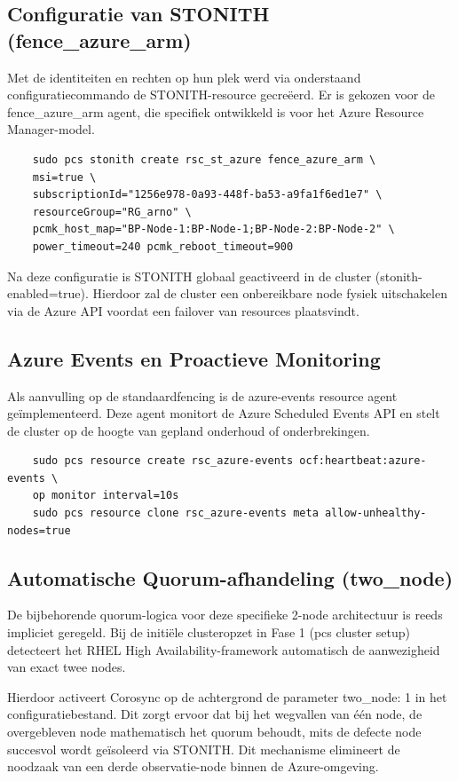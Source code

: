 \subsection{Configuratie van STONITH (fence\_azure\_arm)}
Met de identiteiten en rechten op hun plek werd via onderstaand configuratiecommando de STONITH-resource gecreëerd. Er is gekozen voor de fence\_azure\_arm agent, die specifiek ontwikkeld is voor het Azure Resource Manager-model.

\begin{verbatim}
    sudo pcs stonith create rsc_st_azure fence_azure_arm \
    msi=true \
    subscriptionId="1256e978-0a93-448f-ba53-a9fa1f6ed1e7" \
    resourceGroup="RG_arno" \
    pcmk_host_map="BP-Node-1:BP-Node-1;BP-Node-2:BP-Node-2" \
    power_timeout=240 pcmk_reboot_timeout=900
\end{verbatim}

Na deze configuratie is STONITH globaal geactiveerd in de cluster (stonith-enabled=true). Hierdoor zal de cluster een onbereikbare node fysiek uitschakelen via de Azure API voordat een failover van resources plaatsvindt.

\subsection{Azure Events en Proactieve Monitoring}
Als aanvulling op de standaardfencing is de azure-events resource agent geïmplementeerd. Deze agent monitort de Azure Scheduled Events API en stelt de cluster op de hoogte van gepland onderhoud of onderbrekingen.

\begin{verbatim}
    sudo pcs resource create rsc_azure-events ocf:heartbeat:azure-events \
    op monitor interval=10s
    sudo pcs resource clone rsc_azure-events meta allow-unhealthy-nodes=true
\end{verbatim}

\subsection{Automatische Quorum-afhandeling (two\_node)}
De bijbehorende quorum-logica voor deze specifieke 2-node architectuur is reeds impliciet geregeld. Bij de initiële clusteropzet in Fase 1 (pcs cluster setup) detecteert het RHEL High Availability-framework automatisch de aanwezigheid van exact twee nodes.
\medskip 

Hierdoor activeert Corosync op de achtergrond de parameter two\_node: 1 in het configuratiebestand. Dit zorgt ervoor dat bij het wegvallen van één node, de overgebleven node mathematisch het quorum behoudt, mits de defecte node succesvol wordt geïsoleerd via STONITH. Dit mechanisme elimineert de noodzaak van een derde observatie-node binnen de Azure-omgeving.

